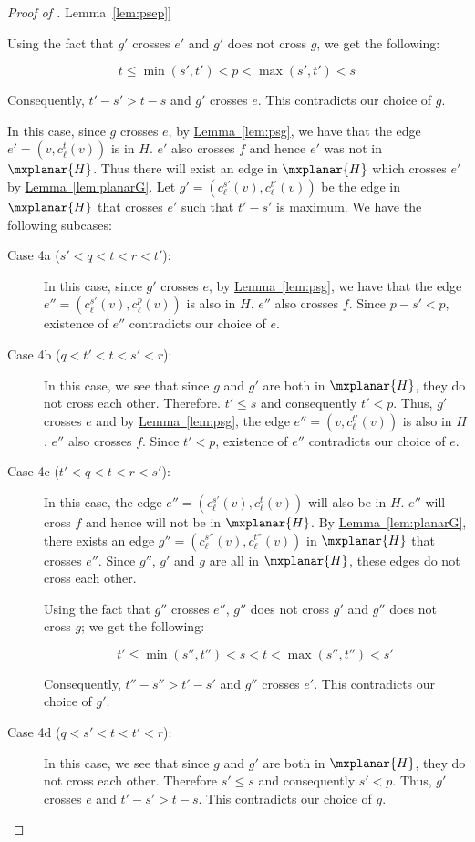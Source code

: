 \documentclass[11pt]{article}
\numberwithin{equation}{section}
\theoremstyle{definition}
\theoremstyle{plain}
\newcommand{\expref}[2]{\hyperref[#2]{#1~\ref{#2}}}
\begin{document}
\begin{proof}[Proof of \expref{Lemma}{lem:psep}]
\begin{description}
Using the fact that $g'$ crosses $e'$ and $g'$ does not cross $g$, we get the following:

\[t \leq \min(s',t') < p < \max(s', t') < s\]

Consequently, $t'-s' > t-s$ and $g'$ crosses $e$. This contradicts our choice of $g$.


\item[Case 4 ($q<s<p<t<r$):] In this case, since $g$ crosses $e$, by
\expref{Lemma}{lem:psg}, we have that the edge $e' = (v, c_{\ell}^t(v))$ is %
 in $H$. $e'$ also crosses $f$ and hence $e'$ was not %
 in $\mxplanar{H}$. Thus there will exist an edge in $\mxplanar{H}$ which crosses $e'$ by \expref{Lemma}{lem:planarG}. Let $g' = (c_{\ell}^{s'}(v), c_{\ell}^{t'}(v))$ be the edge in $\mxplanar{H}$ that crosses $e'$ such that $t'-s'$ is maximum. We have the following subcases:
\begin{description}
\item[Case 4a ($s'<q<t<r<t'$):]In this case, since $g'$ crosses $e$, by \expref{Lemma}{lem:psg}, we have that the edge $e'' = (c_{\ell}^{s'}(v), c_{\ell}^p(v))$ is also %
 in $H$. $e''$ also crosses $f$. Since $p-s' < p$, existence of $e''$ contradicts our choice of $e$.
\item[Case 4b ($q<t'<t<s'<r$):] In this case, we see that since $g$ and $g'$ are both %
 in $\mxplanar{H}$, they
do not %
cross each other. Therefore. $t' \leq s$ and consequently $t' < p$. Thus, $g'$ crosses $e$ and by \expref{Lemma}{lem:psg}, the edge $e'' = (v, c_{\ell}^{t'}(v))$ is also %
 in $H$. $e''$ also crosses $f$. Since $t' < p$, existence of $e''$ contradicts our choice of $e$.
\item[Case 4c ($t'<q<t<r<s'$):] In this case, the edge $e'' = (c_{\ell}^{s'}(v), c_{\ell}^t(v))$ will also be %
 in $H$. $e''$ will cross $f$ and hence will not be %
 in $\mxplanar{H}$. By \expref{Lemma}{lem:planarG}, there exists an edge $g'' = (c_{\ell}^{s''}(v), c_{\ell}^{t''}(v))$ in $\mxplanar{H}$ that crosses $e''$. Since $g''$, $g'$ and $g$ are all %
 in $\mxplanar{H}$, these edges 
do not %
cross each other. 

Using the fact that $g''$ crosses $e''$, $g''$ does not cross $g'$ and $g''$ does not cross $g$; we get the following:

\[t' \leq \min(s'',t'') <s< t < \max(s'', t'') < s'\]

Consequently, $t''-s'' > t'-s'$ and $g''$ crosses $e'$. This contradicts our choice of $g'$.

\item[Case 4d ($q<s'<t<t'<r$):] In this case, we see that since $g$ and $g'$ are both %
 in $\mxplanar{H}$, they
do not %
cross each other. Therefore $s' \leq s$ and consequently $s' < p$. Thus, $g'$ crosses $e$ and $t' - s' > t-s$. This contradicts our choice of $g$.


\end{description}
\end{description}
\end{proof}
\end{document}
